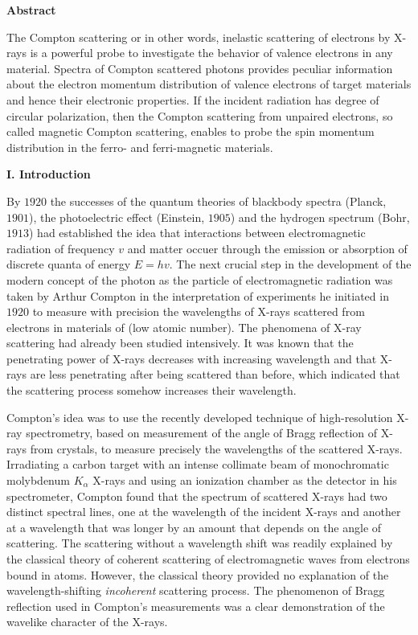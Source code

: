 \documentclass[fleqn]{article}
\begin{document}
  \textbf{Abstract}

  \vspace{10px}

  The Compton scattering or in other words, inelastic scattering of electrons by X-rays is a powerful probe to investigate the behavior of valence 
  electrons in any material. Spectra of Compton scattered photons provides peculiar information about the electron momentum distribution of 
  valence electrons of target materials and hence their electronic properties. If the incident radiation has degree of circular polarization, 
  then the Compton scattering from unpaired electrons, so called magnetic Compton scattering, enables to probe the spin momentum 
  distribution in the ferro- and ferri-magnetic materials.

  \vspace{20px}

  \textbf{I. Introduction}

  \vspace{10px}

  By $1920$ the successes of the quantum theories of blackbody spectra (Planck, $1901$), the photoelectric effect (Einstein, $1905$) 
  and the hydrogen spectrum (Bohr, $1913$) had established the idea that interactions between electromagnetic radiation of frequency $v$ and matter
  occuer through the emission or absorption of discrete quanta of energy $E=hv$. The next crucial step in the development of the modern concept
  of the photon as the particle of electromagnetic radiation was taken by Arthur Compton in the interpretation 
  of experiments he initiated in $1920$ to measure with precision the wavelengths of X-rays scattered from electrons in materials of 
  (low atomic number). The phenomena of X-ray scattering had already been studied intensively. It was known that the 
  penetrating power of X-rays decreases with increasing wavelength and that X-rays are less penetrating after being scattered than 
  before, which indicated that the scattering process somehow increases their wavelength. 

  Compton’s idea was to use the recently developed 
  technique of high-resolution X-ray spectrometry, based on measurement of the angle of Bragg reflection of X-rays from crystals, 
  to measure precisely the wavelengths of the scattered X-rays. Irradiating a carbon target with an intense collimate beam of monochromatic molybdenum 
  $K_{\alpha}$ X-rays and using an ionization chamber as the detector in his spectrometer, Compton found that the
  spectrum of scattered X-rays had two distinct spectral lines, one at the wavelength of the incident X-rays and another at a wavelength that was 
  longer by an amount that depends on the angle of scattering. The scattering without a wavelength shift was readily explained by the classical theory 
  of coherent scattering of electromagnetic waves from electrons bound in atoms. However, the classical theory provided no explanation of the 
  wavelength-shifting \emph{incoherent} scattering process. The phenomenon of Bragg reflection used in Compton’s measurements was a clear demonstration 
  of the wavelike character of the X-rays. 
\end{document}
